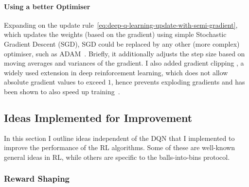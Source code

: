 \paragraph{Using a better Optimiser}


Expanding on the update rule~\eqref{eq:deep-q-learning-update-with-semi-gradient}, which updates the weights (based on the gradient) using simple Stochastic Gradient Descent (SGD), SGD could be replaced by any other (more complex) optimiser, such as ADAM~\cite{kingma2015adamoptimiser}. Briefly, it additionally adjusts the step size based on moving averages and variances of the gradient. I also added gradient clipping \cite{mikolov2012gradientclippingoriginal}, a widely used extension in deep reinforcement learning, which does not allow absolute gradient values to exceed $1$, hence prevents exploding gradients and has been shown to also speed up training~\cite{zhang2020gradientclippingaccelerate}.



\subsection{Ideas Implemented for Improvement} \label{improvementideas}


In this section I outline ideas independent of the DQN that I implemented to improve the performance of the RL algorithms. Some of these are well-known general ideas in RL, while others are specific to the \TwoThinning balls-into-bins protocol.


\subsubsection{Reward Shaping} \label{rewardshaping}

